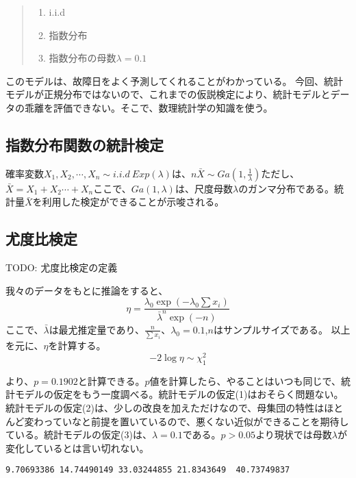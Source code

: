\documentclass[a4paper,11pt,dvipdfmx]{jsarticle}
\begin{document}
\begin{quote}
    \begin{enumerate}[(1)]
\item i.i.d
\item 指数分布
\item 指数分布の母数$\lambda=0.1$
\end{enumerate}
\end{quote}
このモデルは、故障日をよく予測してくれることがわかっている。
今回、統計モデルが正規分布ではないので、これまでの仮説検定により、統計モデルとデータの乖離を評価できない。そこで、数理統計学の知識を使う。

\subsection{指数分布関数の統計検定}
確率変数$X_1,X_2,\cdots,X_n \sim i.i.d \ Exp(\lambda)$は、$n\bar{X}\sim Ga(1,\frac{1}{\lambda}) $ただし、$\bar{X}=X_1+X_2 \cdots +X_n$ここで、$Ga(1,\lambda)$は、尺度母数$\lambda$のガンマ分布である。統計量$\bar{X}$を利用した検定ができることが示唆される。



\subsection{尤度比検定}
TODO: 尤度比検定の定義

我々のデータをもとに推論をすると、
$$
\eta= \frac{\lambda_0\exp\left({-\lambda_0\sum x_i}\right)}{\bar{\lambda}^n \exp{(-n)}}
$$
ここで、$\bar{\lambda}$は最尤推定量であり、$\frac{n}{\sum x_i}$、$\lambda_0=0.1$,$n$はサンプルサイズである。
以上を元に、$\eta$を計算する。
$$
-2\log \eta \sim \chi^2_1
$$

より、$p=0.1902$と計算できる。$p$値を計算したら、やることはいつも同じで、統計モデルの仮定をもう一度調べる。統計モデルの仮定(1)はおそらく問題ない。統計モデルの仮定(2)は、少しの改良を加えただけなので、母集団の特性はほとんど変わっていなと前提を置いているので、悪くない近似ができることを期待している。統計モデルの仮定(3)は、$\lambda=0.1$である。$p>0.05$より現状では母数$\lambda$が変化しているとは言い切れない。




\begin{lstlisting}
9.70693386 14.74490149 33.03244855 21.8343649  40.73749837
\end{lstlisting}
\end{document}
